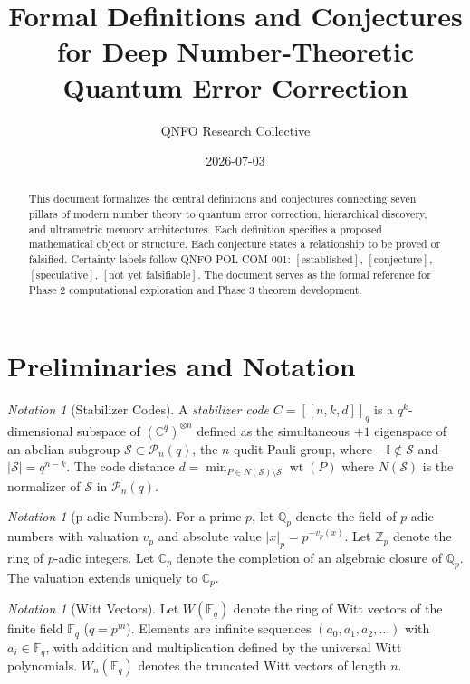 \documentclass[12pt]{article}
\title{Formal Definitions and Conjectures for Deep Number-Theoretic \\
Quantum Error Correction}
\author{QNFO Research Collective}
\date{2026-07-03}
\theoremstyle{remark}
\newtheorem{notation}[definition]{Notation}
\begin{document}
\maketitle

\begin{abstract}
This document formalizes the central definitions and conjectures connecting
seven pillars of modern number theory to quantum error correction, hierarchical
discovery, and ultrametric memory architectures. Each definition specifies a
proposed mathematical object or structure. Each conjecture states a relationship
to be proved or falsified. Certainty labels follow QNFO-POL-COM-001:
$[\text{established}]$, $[\text{conjecture}]$, $[\text{speculative}]$,
$[\text{not yet falsifiable}]$. The document serves as the formal reference
for Phase 2 computational exploration and Phase 3 theorem development.
\end{abstract}

\section{Preliminaries and Notation}

\begin{notation}[Stabilizer Codes]
A \emph{stabilizer code} $C = [[n,k,d]]_q$ is a $q^k$-dimensional subspace of
$(\mathbb{C}^q)^{\otimes n}$ defined as the simultaneous $+1$ eigenspace of an
abelian subgroup $\mathcal{S} \subset \mathcal{P}_n(q)$, the $n$-qudit Pauli
group, where $-\mathbb{I} \notin \mathcal{S}$ and $|\mathcal{S}| = q^{n-k}$.
The code distance $d = \min_{P \in N(\mathcal{S}) \setminus \mathcal{S}}
\operatorname{wt}(P)$ where $N(\mathcal{S})$ is the normalizer of $\mathcal{S}$
in $\mathcal{P}_n(q)$.
\end{notation}

\begin{notation}[p-adic Numbers]
For a prime $p$, let $\mathbb{Q}_p$ denote the field of $p$-adic numbers with
valuation $v_p$ and absolute value $|x|_p = p^{-v_p(x)}$. Let $\mathbb{Z}_p$
denote the ring of $p$-adic integers. Let $\mathbb{C}_p$ denote the completion
of an algebraic closure of $\mathbb{Q}_p$. The valuation extends uniquely to
$\mathbb{C}_p$.
\end{notation}

\begin{notation}[Witt Vectors]
Let $W(\mathbb{F}_q)$ denote the ring of Witt vectors of the finite field
$\mathbb{F}_q$ ($q = p^m$). Elements are infinite sequences
$(a_0, a_1, a_2, \ldots)$ with $a_i \in \mathbb{F}_q$, with addition and
multiplication defined by the universal Witt polynomials.
$W_n(\mathbb{F}_q)$ denotes the truncated Witt vectors of length $n$.
\end{notation}
\end{document}
